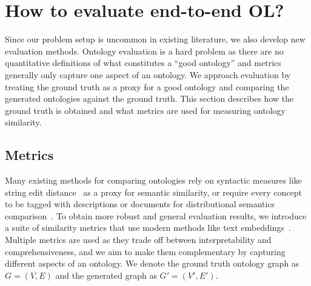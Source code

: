 \section{How to evaluate end-to-end OL?}  \label{sec:implementation:evaluation}

Since our problem setup is uncommon in existing literature, we also develop new evaluation methods. Ontology evaluation is a hard problem as there are no quantitative definitions of what constitutes a ``good ontology'' and metrics generally only capture one aspect of an ontology. We approach evaluation by treating the ground truth as a proxy for a good ontology and comparing the generated ontologies against the ground truth. This section describes how the ground truth is obtained and what metrics are used for measuring ontology similarity.


\subsection{Metrics}

Many existing methods for comparing ontologies rely on syntactic measures like string edit distance~\cite{Ehrig2005SimilarityFO} as a proxy for semantic similarity, or require every concept to be tagged with descriptions or documents for distributional semantics comparison~\cite{Zavitsanos2011GoldSE}. To obtain more robust and general evaluation results, we introduce a suite of similarity metrics that use modern methods like text embeddings~\cite{reimers-2019-sentence-bert}. Multiple metrics are used as they trade off between interpretability and comprehensiveness, and we aim to make them complementary by capturing different aspects of an ontology. We denote the ground truth ontology graph as $G = (V, E)$ and the generated graph as $G' = (V', E')$.

